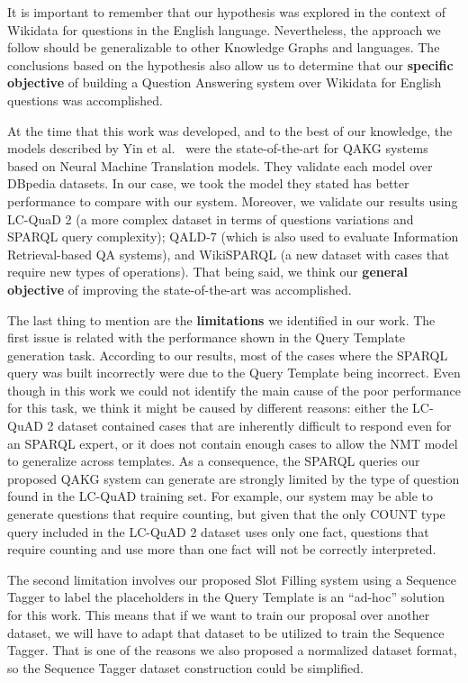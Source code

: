 It is important to remember that our hypothesis was explored in the context of Wikidata for questions 
in the English language. Nevertheless, the approach we follow should be generalizable to other 
Knowledge Graphs and languages. The conclusions based on the hypothesis also allow us to determine 
that our \textbf{specific objective} of building a Question Answering system over Wikidata for 
English questions was accomplished.

At the time that this work was developed, and to the best of our knowledge, the models described by 
Yin et al.~\cite{nmt:nl-to-sparql-Yin19} were the state-of-the-art for QAKG systems based on Neural 
Machine Translation models. They validate each model over DBpedia datasets. In our case, we took the 
model they stated has better performance to compare with our system. Moreover, we validate our 
results using LC-QuaD 2 (a more complex dataset in terms of questions variations and SPARQL query 
complexity); QALD-7 (which is also used to evaluate Information Retrieval-based QA systems), and 
WikiSPARQL (a new dataset with cases that require new types of operations). That being said, we 
think our \textbf{general objective} of improving the state-of-the-art was accomplished.

The last thing to mention are the \textbf{limitations} we identified in our work. The first issue is 
related with the performance shown in the Query Template generation task. According to our results, 
most of the cases where the SPARQL query was built incorrectly were due to the Query Template being 
incorrect. Even though in this work we could not identify the main cause of the poor performance for 
this task, we think it might be caused by different reasons: either the LC-QuAD 2 dataset contained 
cases that are inherently difficult to respond even for an SPARQL expert, or it does not contain 
enough cases to allow the NMT model to generalize across templates. As a consequence, the SPARQL 
queries our proposed QAKG system can generate are strongly limited by the type of question found in 
the LC-QuAD training set. For example, our system may be able to generate questions that require 
counting, but given that the only COUNT type query included in the LC-QuAD 2 dataset uses only one 
fact, questions that require counting and use more than one fact will not be correctly interpreted.

The second limitation involves our proposed Slot Filling system using a Sequence Tagger to label the 
placeholders in the Query Template is an “ad-hoc” solution for this work. This means that if we want 
to train our proposal over another dataset, we will have to adapt that dataset to be utilized to 
train the Sequence Tagger. That is one of the reasons we also proposed a normalized dataset format, 
so the Sequence Tagger dataset construction could be simplified.

